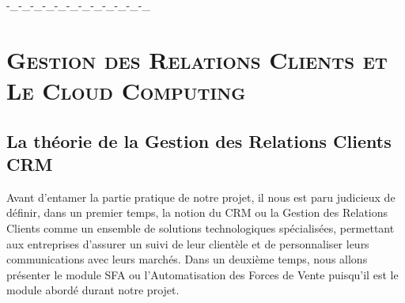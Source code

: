 \documentclass[a4paper, 12pt]{report}
\begin{document}
\begin{itemize}
 -_-_-_-_-_-_-_-_-_-_-_-_

\chapter{\textsc{Gestion des Relations Clients et Le Cloud Computing
}}

\section{La théorie de la Gestion des Relations Clients CRM }
Avant d’entamer la partie pratique de notre projet, il nous est paru judicieux de définir, dans un premier temps, la notion du CRM ou la Gestion des Relations Clients comme un ensemble de solutions technologiques spécialisées, permettant aux entreprises d’assurer un suivi de leur clientèle et de personnaliser leurs communications avec leurs marchés. Dans un deuxième temps, nous allons présenter le module SFA ou l’Automatisation des Forces de Vente puisqu’il est le module abordé durant notre projet. 

\end{itemize}
\end{document}

